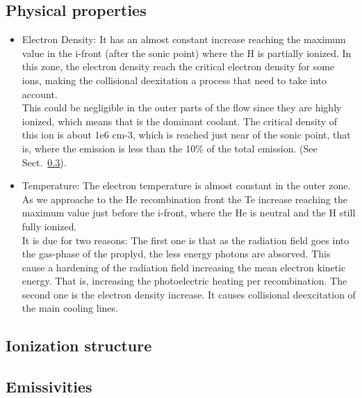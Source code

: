 \documentclass[aaspp]{article}
\begin{document}
\subsection{Physical properties}
\label{sec:physical}

\begin{itemize}
  \item{Electron Density: It has an almost constant increase reaching
      the maximum value in the i-front (after the sonic point) where the H is partially
      ionized. In this zone, the electron density reach the critical
      electron density for some ions, making the collisional
      deexitation a process that need to take into account.\\
    This could be negligible in the outer parts of the flow since they
    are highly ionized, which means that \oiii is the dominant
    coolant. The critical density of this ion is about 1e6 cm-3, which
  is reached just near of the sonic point, that is, where the \oiii
  emission is less than the 10\% of the total \oiii emission. (See Sect.~\ref{sec:emi}).
}
  \item{Temperature: The electron temperature is almost constant in
      the outer zone. As we approache to the He recombination front
      the Te increase reaching the maximum value just before the
      i-front, where the He is neutral and the H still fully ionized. \\
    It is due for two reasons: The first one is that as the radiation
    field goes into the gas-phase of the proplyd, the less energy
    photons are absorved. This cause a hardening of the radiation
    field increasing the mean electron kinetic energy. That is,
    increasing the photoelectric heating per recombination. The second
  one is the electron density increase. It causes collisional
  deexcitation of the main cooling lines.
}
\end{itemize}

\subsection{Ionization structure}
\label{sec:ionization}



\subsection{Emissivities}
\label{sec:emi}
\end{document}
